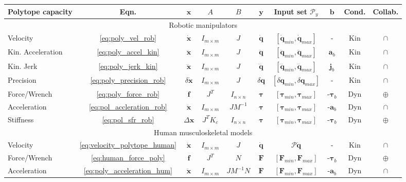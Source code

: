 \begin{table}[!b]
\centering
\begin{tabular}{|l|c|c|c|c|c|c|c|c|c|}
\hline
Polytope capacity & Eqn. & $\bm{x}$ & $A$ & $B$ & $\bm{y}$ & Input set $\mathcal{P}_y$ & $\bm{b}$ & Cond. & Collab. \\
\hline
\multicolumn{10}{c}{Robotic manipulators} \\
\hline
Velocity & \ref{eq:poly_vel_rob}& $\dot{\bm{x}}$ & $I_{m\times m}$ & $J$ & $\dot{\bm{q}}$& $[\dot{\bm{q}}_{min},\dot{\bm{q}}_{max}]$ & - & Kin & $\cap$ \\
Kin. Acceleration & \ref{eq:poly_accel_kin} & $\ddot{\bm{x}}$ & $I_{m\times m}$ & $J$ & $\ddot{\bm{q}}$ & $[\ddot{\bm{q}}_{min},\ddot{\bm{q}}_{max}]$ & $\bm{a}_b$ & Kin & $\cap$ \\
Kin. Jerk &\ref{eq:poly_jerk_kin} & $\dddot{\bm{x}}$ & $I_{m\times m}$ & $J$ & $\dddot{\bm{q}}$& $[\dddot{\bm{q}}_{min},\dddot{\bm{q}}_{max}]$ & $\bm{j}_b$ & Kin & $\cap$ \\
Precision & \ref{eq:poly_precision_rob} & $\delta\dot{\bm{x}}$ & $I_{m\times m}$ & $J$ & $\delta\bm{q}$ &$[\delta{\bm{q}}_{min},\delta{\bm{q}}_{max}]$ & - & Kin & $\cap$ \\
Force/Wrench & \ref{eq:poly_force_rob} & $\bm{f}$ & $J^T$ & $I_{n\times n}$ & $\bm{\tau}$ &$[\bm{\tau}_{min},\bm{\tau}_{max}]$ & -$\bm{\tau}_b$ & Dyn & $\oplus$ \\
Acceleration & \ref{eq:pol_accleration_rob} & $\ddot{\bm{x}}$ & $I_{m\times m}$ & $JM^{-1}$ & $\bm{\tau}$ &$[\bm{\tau}_{min},\bm{\tau}_{max}]$ & -$\bm{a}_b$ & Dyn & $\cap$ \\
Stiffness & \ref{eq:pol_sfr_rob}& $\Delta\bm{x}$ & $J^TK_c$ & $I_{n\times n}$ & $\bm{\tau}$ &$[\bm{\tau}_{min},\bm{\tau}_{max}]$ & -$\bm{\tau}_b$ & Dyn & $\oplus$ \\
\hline
\multicolumn{10}{c}{Human musculoskeletal models} \\
\hline
Velocity &\ref{eq:velocity_polytope_human} & $\dot{\bm{x}}$ & $I_{m\times m}$ & $J$ & $\dot{\bm{q}}$ & $\mathcal{P}{\dot{\bm{q}}}$ & - & Kin & $\cap$ \\
Force/Wrench & \ref{eq:human_force_poly} & $\bm{f}$ & $J^T$ & $N$ & $\bm{F}$ & $[\bm{F}_{min},\bm{F}_{max}]$ & -$\bm{\tau}_b$ & Dyn & $\oplus$ \\
Acceleration & \ref{eq:poly_acceleration_hum} & $\ddot{\bm{x}}$ & $I_{m\times m}$ & $JM^{-1}N$ & $\bm{F}$ & $[\bm{F}_{min},\bm{F}_{max}]$ & -$\bm{a}_b$ & Dyn & $\cap$ \\

\end{tabular}
\end{table}
